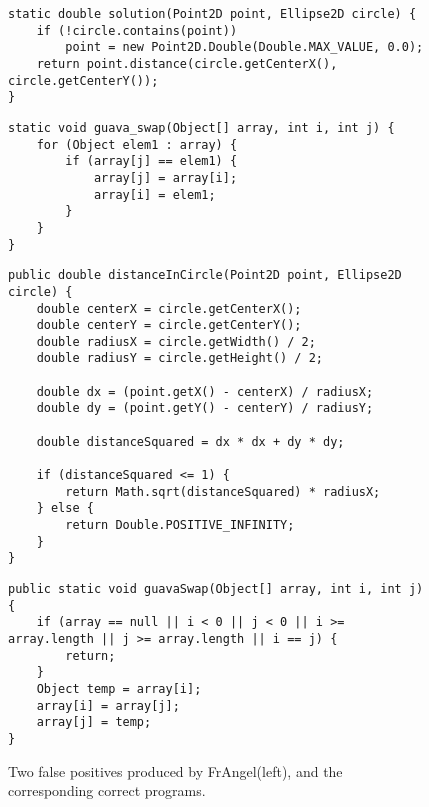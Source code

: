 \begin{figure}
\centering
    \begin{minipage}[t]{0.47\linewidth}
        \begin{lstlisting}[style = Java-github]
static double solution(Point2D point, Ellipse2D circle) {
    if (!circle.contains(point))
        point = new Point2D.Double(Double.MAX_VALUE, 0.0);
    return point.distance(circle.getCenterX(), circle.getCenterY());
}
        \end{lstlisting}
        \vspace{.82in}
        \begin{lstlisting}[style = Java-github]
static void guava_swap(Object[] array, int i, int j) {
    for (Object elem1 : array) {
        if (array[j] == elem1) {
            array[j] = array[i];
            array[i] = elem1;
        }
    }
}
        \end{lstlisting}
    \end{minipage}
\hspace{.2in}
    \begin{minipage}[t]{0.47\linewidth}
        \begin{lstlisting}[style = Java-github]
public double distanceInCircle(Point2D point, Ellipse2D circle) {
    double centerX = circle.getCenterX();
    double centerY = circle.getCenterY();
    double radiusX = circle.getWidth() / 2;
    double radiusY = circle.getHeight() / 2;
        
    double dx = (point.getX() - centerX) / radiusX;
    double dy = (point.getY() - centerY) / radiusY;
        
    double distanceSquared = dx * dx + dy * dy;
        
    if (distanceSquared <= 1) {
        return Math.sqrt(distanceSquared) * radiusX;
    } else {
        return Double.POSITIVE_INFINITY;
    }
}
        \end{lstlisting}
        \begin{lstlisting}[style = Java-github]
public static void guavaSwap(Object[] array, int i, int j) {
    if (array == null || i < 0 || j < 0 || i >= array.length || j >= array.length || i == j) {
        return;
    }
    Object temp = array[i];
    array[i] = array[j];
    array[j] = temp;
}
        \end{lstlisting}
    \end{minipage}
\caption{Two false positives produced by FrAngel(left), and the corresponding correct programs.}
\label{fig:figure6}
\end{figure}

